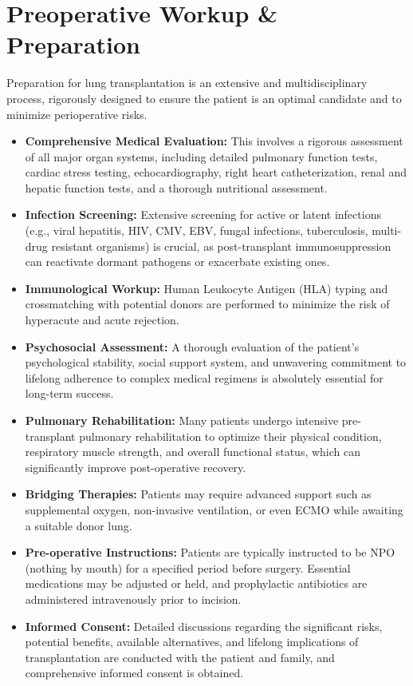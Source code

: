 \section*{Preoperative Workup \& Preparation}
Preparation for lung transplantation is an extensive and multidisciplinary process, rigorously designed to ensure the patient is an optimal candidate and to minimize perioperative risks.

\begin{itemize}
  \item \textbf{Comprehensive Medical Evaluation:} This involves a rigorous assessment of all major organ systems, including detailed pulmonary function tests, cardiac stress testing, echocardiography, right heart catheterization, renal and hepatic function tests, and a thorough nutritional assessment.
  \item \textbf{Infection Screening:} Extensive screening for active or latent infections (e.g., viral hepatitis, HIV, CMV, EBV, fungal infections, tuberculosis, multi-drug resistant organisms) is crucial, as post-transplant immunosuppression can reactivate dormant pathogens or exacerbate existing ones.
  \item \textbf{Immunological Workup:} Human Leukocyte Antigen (HLA) typing and crossmatching with potential donors are performed to minimize the risk of hyperacute and acute rejection.
  \item \textbf{Psychosocial Assessment:} A thorough evaluation of the patient's psychological stability, social support system, and unwavering commitment to lifelong adherence to complex medical regimens is absolutely essential for long-term success.
  \item \textbf{Pulmonary Rehabilitation:} Many patients undergo intensive pre-transplant pulmonary rehabilitation to optimize their physical condition, respiratory muscle strength, and overall functional status, which can significantly improve post-operative recovery.
  \item \textbf{Bridging Therapies:} Patients may require advanced support such as supplemental oxygen, non-invasive ventilation, or even ECMO while awaiting a suitable donor lung.
  \item \textbf{Pre-operative Instructions:} Patients are typically instructed to be NPO (nothing by mouth) for a specified period before surgery. Essential medications may be adjusted or held, and prophylactic antibiotics are administered intravenously prior to incision.
  \item \textbf{Informed Consent:} Detailed discussions regarding the significant risks, potential benefits, available alternatives, and lifelong implications of transplantation are conducted with the patient and family, and comprehensive informed consent is obtained.
\end{itemize}

